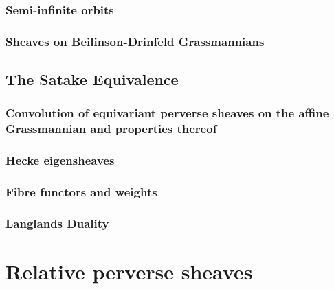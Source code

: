             \subsubsection{Semi-infinite orbits}
            
            \subsubsection{Sheaves on Beilinson-Drinfeld Grassmannians}
            
        \subsection{The Satake Equivalence}
            \subsubsection{Convolution of equivariant perverse sheaves on the affine Grassmannian and properties thereof}
            
            \subsubsection{Hecke eigensheaves}
            
            \subsubsection{Fibre functors and weights}
            
            \subsubsection{Langlands Duality}
    
    \section{Relative perverse sheaves}
